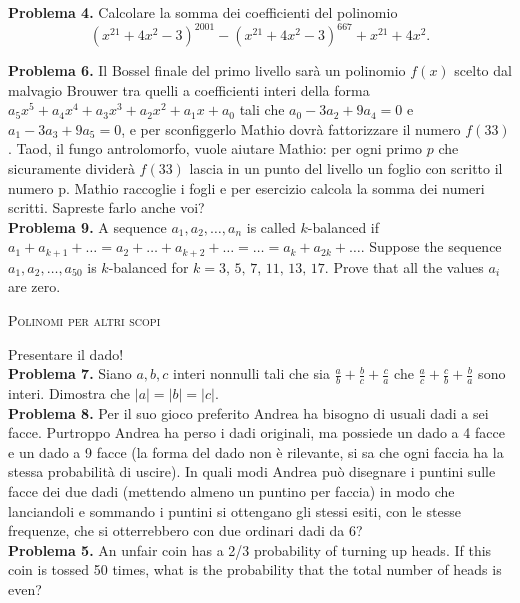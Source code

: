 \documentclass[a4paper]{article}
\theoremstyle{remark}
\theoremstyle{definition}
\begin{document}
\begin{multicols}{2}
	\textbf{Problema 4.} Calcolare la somma dei coefficienti del polinomio
	\[ (x^{21} + 4x^2 - 3)^{2001} - (x^{21} + 4x^2 - 3)^{667} +x^{21} +4x^2. \]
	

	
	\textbf{Problema 6.} Il Bossel finale del primo livello sarà un polinomio $ f (x) $ scelto dal malvagio Brouwer tra quelli a coefficienti interi
	della forma $ a_5x^5 + a_4 x^4 + a_3 x^3 + a_2 x^2 + a_1 x + a_0 $ tali che $ a_0 - 3a_2 + 9a_4 = 0 $ e $ a_1 - 3a_3 + 9a_5 = 0 $, e per sconfiggerlo
	Mathio dovrà fattorizzare il numero $ f (33) $. Taod, il fungo antrolomorfo, vuole aiutare Mathio: per ogni primo $ p $ che
	sicuramente dividerà $ f (33) $ lascia in un punto del livello un foglio con scritto il numero p. Mathio raccoglie i fogli e
	per esercizio calcola la somma dei numeri scritti. Sapreste farlo anche voi? \\
	
	\textbf{Problema 9.} A sequence $ a_1, a_2, \dots, a_n $ is called $ k $-balanced if $ a_1 + a_{k+1} + \dots = a_2 + \dots + a_{k+2} + \dots = \dots = 
	a_k +a_{2k} + \dots $. Suppose the sequence $ a_1, a_2, \dots , a_{50} $ is $ k $-balanced for $ k = 3,\, 5,\, 7,\, 11,\, 13,\, 17 $. Prove
	that all the values $ a_i $ are zero. \\
	
	\begin{center}
		\textsc{Polinomi per altri scopi}
	\end{center}
	
	Presentare il dado! \\
	
	\textbf{Problema 7.} Siano $ a, b, c $ interi nonnulli tali che sia $ \frac{a}{b} +\frac{b}{c}+ \frac{c}{a} $ che $ \frac{a}{c} +\frac{c}{b}+ \frac{b}{a} $ sono interi. Dimostra che $ |a| = |b| = |c| $. \\
	
	\textbf{Problema 8.} Per il suo gioco preferito Andrea ha bisogno di usuali dadi a sei facce. Purtroppo Andrea ha perso i dadi originali, ma possiede un dado a 4 facce e un dado a 9 facce (la forma del dado non è rilevante, si sa che ogni faccia ha la stessa probabilità di uscire). In quali modi Andrea può disegnare i puntini sulle facce dei due dadi (mettendo almeno un puntino per faccia) in modo che lanciandoli e sommando i puntini si ottengano gli stessi esiti, con le stesse frequenze, che si otterrebbero con due ordinari dadi da 6? \\
	
	\textbf{Problema 5.} An unfair coin has a 2/3 probability of turning up heads. If this coin is tossed 50 times, what is the probability that the total number of heads is even? \\
	
	
	
	
	
	
\end{multicols}
\end{document}
